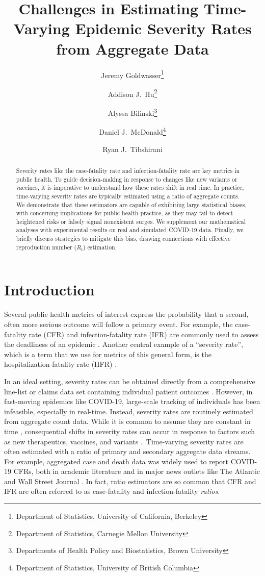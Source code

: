 \documentclass{article}
\title{Challenges in Estimating Time-Varying Epidemic Severity Rates from
  Aggregate Data}
\author{Jeremy Goldwasser\thanks{Department of Statistics, University of
    California, Berkeley} 
  \and  
  Addison J.\ Hu\thanks{Department of Statistics, Carnegie Mellon University}
  \and 
  Alyssa Bilinski\thanks{Departments of Health Policy and Biostatistics, Brown University} 
  \and
  Daniel J.\ McDonald\thanks{Department of Statistics, University of British
    Columbia} 
  \and 
  Ryan J.\ Tibshirani\footnotemark[1]}
\date{}
\begin{document}
\maketitle

\begin{abstract}
Severity rates like the case-fatality rate and infection-fatality rate are
key metrics in public health. To guide decision-making in response to changes
like new variants or vaccines, it is imperative to understand how these rates
shift in real time. In practice, time-varying severity rates are typically
estimated using a ratio of aggregate counts. We demonstrate that these
estimators are capable of exhibiting large statistical biases, with concerning
implications for public health practice, as they may fail to detect heightened 
risks or falsely signal nonexistent surges. We supplement our mathematical 
analyses with experimental results on real and simulated COVID-19 data. Finally,
we briefly discuss strategies to mitigate this bias, drawing connections with
effective reproduction number ($R_t$) estimation.    
\end{abstract}

\section{Introduction}

Several public health metrics of interest express the probability that a second,
often more serious outcome will follow a primary event. For example, the
case-fatality rate (CFR) and infection-fatality rate (IFR) are commonly used to
assess the deadliness of an epidemic \citep{nishiuraEx1, nishiuraEx2,
  cfr_line_list, timevar_ifr, lancet_ifr}. Another central example of a
``severity rate'', which is a term that we use for metrics of this general form,
is the hospitalization-fatality rate (HFR) \citep{HFR_linelist3, HFR_linelist1,  
  HFR_linelist2}.

In an ideal setting, severity rates can be obtained directly from a
comprehensive line-list or claims data set containing individual patient
outcomes \citep{HFR_linelist3, cfr_line_list, HFR_linelist1, HFR_linelist2}.
However, in fast-moving epidemics like COVID-19, large-scale tracking of
individuals has been infeasible, especially in real-time. Instead, severity
rates are routinely estimated from aggregate count data. While it is common to
assume they are constant in time \citep{ghani, jewell2007nonparametric,
  reich2012estimating, lancet_controversial}, consequential shifts in severity
rates can occur in response to factors such as new therapeutics, vaccines, and
variants \citep{nyt}. Time-varying severity rates are often estimated with a
ratio of primary and secondary aggregate data streams. For example, aggregated
case and death data was widely used to report COVID-19 CFRs, both in academic
literature \citep{yuan2020monitoring, timevar_ifr, horita2022global,
  LIU2023100350, germany} and in major news outlets like The Atlantic
\citep{atlantic} and Wall Street Journal \citep{wsj}. In fact, ratio estimators
are so common that CFR and IFR are often referred to as case-fatality and
infection-fatality \emph{ratios}.
\end{document}
